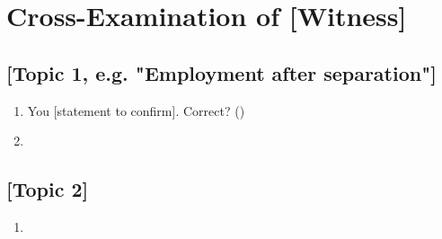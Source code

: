 \section{Cross-Examination of [Witness]}
\label{sec:cross}

\subsection{[Topic 1, e.g. "Employment after separation"]}

\begin{enumerate}
    \item You [statement to confirm]. Correct? \hfill ()
    \item [Next question.]
\end{enumerate}

\subsection{[Topic 2]}

\begin{enumerate}
    \item [Question putting the contradiction directly.]
\end{enumerate}
